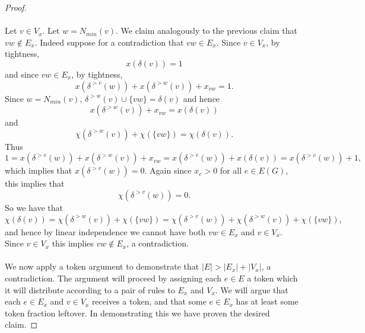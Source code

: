 \begin{proof}
\paragraph{}
Let $v \in V_x$. Let $w = N_{min}(v)$. We claim analogously to the previous claim that $vw \not\in E_x$. Indeed suppose for a contradiction that $vw  \in E_x$. Since $v \in V_x$, by tightness,
$$x(\delta(v)) = 1$$
and since $vw \in E_x$, by tightness,
$$x(\delta^{>v}(w)) + x(\delta^{>w}(v)) + x_{vw} = 1.$$
Since $w = N_{min}(v)$, $\delta^{>w}(v) \cup \{vw\} = \delta(v)$ and hence
$$x(\delta^{>w}(v)) + x_{vw} = x(\delta(v))$$
and
$$\chi(\delta^{>w}(v)) + \chi(\{vw\}) = \chi(\delta(v)).$$
Thus
$$1 = x(\delta^{>v}(w)) + x(\delta^{>w}(v)) + x_{vw} = x(\delta^{>v}(w)) + x(\delta(v)) = x(\delta^{>v}(w)) + 1,$$
which implies that $x(\delta^{>v}(w)) = 0$. Again since $x_e > 0$ for all $e \in E(G)$, this implies that
$$\chi(\delta^{>v}(w)) = 0.$$
So we have that
$$\chi(\delta(v)) = \chi(\delta^{>w}(v)) + \chi(\{vw\}) = \chi(\delta^{>v}(w)) + \chi(\delta^{>w}(v)) + \chi(\{vw\}),$$
and hence by linear independence we cannot have both $vw \in E_x$ and $v \in V_x$. Since $v \in V_x$ this implies $vw \not\in E_x$, a contradiction.

\paragraph{}
We now apply a token argument to demonstrate that $|E|> |E_x| + |V_x|$, a contradiction. The argument will proceed by assigning each $e \in E$ a token which it will distribute according to a pair of rules to $E_x$ and $V_x$. We will argue that each $e \in E_x$ and $v \in V_x$ receives a token, and that some $e \in E_x$ has at least some token fraction leftover. In demonstrating this we have proven the desired claim.

\end{proof}
